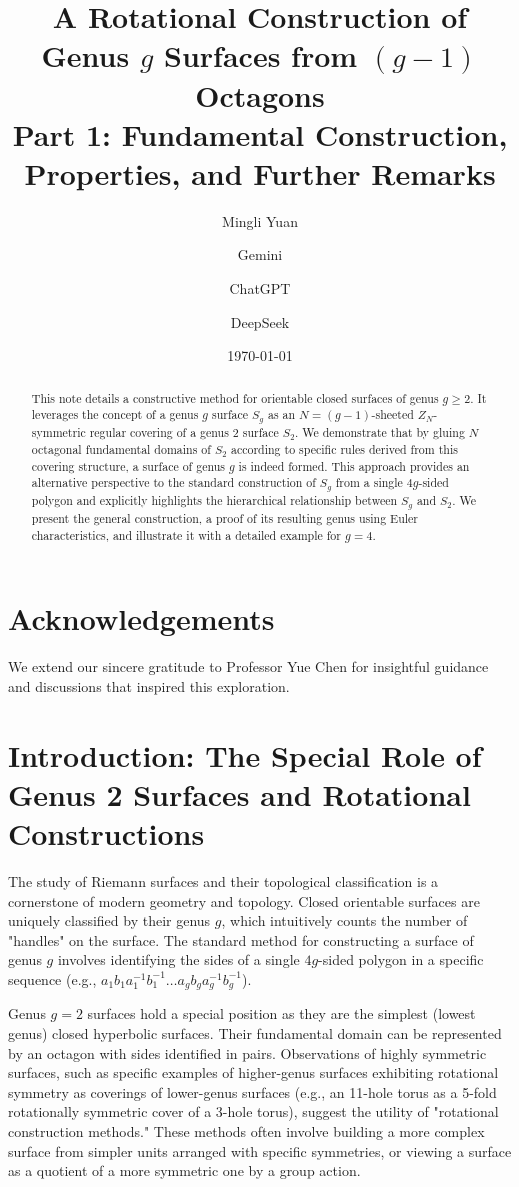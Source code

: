 \documentclass{article}
\title{A Rotational Construction of Genus $g$ Surfaces from $(g-1)$ Octagons\\ Part 1: Fundamental Construction, Properties, and Further Remarks}
\author{Mingli Yuan \and Gemini \and ChatGPT \and DeepSeek}
\date{\today}
\theoremstyle{definition}
\theoremstyle{remark}
\begin{document}
\maketitle

\begin{abstract}
This note details a constructive method for orientable closed surfaces of genus $g \ge 2$. It leverages the concept of a genus $g$ surface $S_g$ as an $N=(g-1)$-sheeted $Z_N$-symmetric regular covering of a genus 2 surface $S_2$. We demonstrate that by gluing $N$ octagonal fundamental domains of $S_2$ according to specific rules derived from this covering structure, a surface of genus $g$ is indeed formed. This approach provides an alternative perspective to the standard construction of $S_g$ from a single $4g$-sided polygon and explicitly highlights the hierarchical relationship between $S_g$ and $S_2$. We present the general construction, a proof of its resulting genus using Euler characteristics, and illustrate it with a detailed example for $g=4$.
\end{abstract}

\section*{Acknowledgements}
We extend our sincere gratitude to Professor Yue Chen for insightful guidance and discussions that inspired this exploration.

\section{Introduction: The Special Role of Genus 2 Surfaces and Rotational Constructions}

The study of Riemann surfaces and their topological classification is a cornerstone of modern geometry and topology. Closed orientable surfaces are uniquely classified by their genus $g$, which intuitively counts the number of "handles" on the surface. The standard method for constructing a surface of genus $g$ involves identifying the sides of a single $4g$-sided polygon in a specific sequence (e.g., $a_1 b_1 a_1^{-1} b_1^{-1} \ldots a_g b_g a_g^{-1} b_g^{-1}$).

Genus $g=2$ surfaces hold a special position as they are the simplest (lowest genus) closed hyperbolic surfaces. Their fundamental domain can be represented by an octagon with sides identified in pairs. Observations of highly symmetric surfaces, such as specific examples of higher-genus surfaces exhibiting rotational symmetry as coverings of lower-genus surfaces (e.g., an 11-hole torus as a 5-fold rotationally symmetric cover of a 3-hole torus), suggest the utility of "rotational construction methods." These methods often involve building a more complex surface from simpler units arranged with specific symmetries, or viewing a surface as a quotient of a more symmetric one by a group action.
\end{document}
